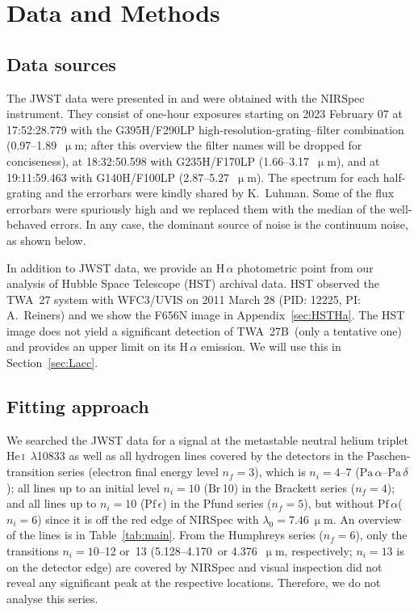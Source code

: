 \documentclass[twocolumn,twocolumnappendix]{aastex631}
\def\mum{\ensuremath{\upmu\mathrm{m}}\xspace}
\newcommand{\neuI}[1]{{\leavevmode{\boldmath\bfseries#1}}}
\newcommand{\neuII}[1]{{\leavevmode{\boldmath\bfseries#1}}}
\renewcommand{\neuI}[1]{{\leavevmode#1}}
\renewcommand{\neuII}[1]{{\leavevmode#1}}
\def\Ha{\ensuremath{\mathrm{H}\,\alpha}\xspace}             %
\def\Paa{\ensuremath{\mathrm{Pa}\,\alpha}\xspace}           %
\def\Pad{\ensuremath{\mathrm{Pa}\,\delta}\xspace}           %
\def\Brz{\ensuremath{\mathrm{Br}}\,10\xspace}               %
\def\Pfa{\ensuremath{\mathrm{Pf}\,\alpha}\xspace}           %
\def\Pfe{\ensuremath{\mathrm{Pf}\,\epsilon}\xspace}         %
\def\HeI{\ensuremath{\mathrm{He}}\,\textsc{i}\xspace}       %
\def\HeItVak{\HeI~\ensuremath{\lambda}10833\xspace}         %
\def\twb{TWA~27B\xspace}
\begin{document}
%

\section{Data and Methods}
 \label{sec:datmeth}


\subsection{Data sources}



The JWST data were presented in \citet{luhman23c} and were obtained with the NIRSpec instrument. They consist of one-hour exposures starting on
2023 February 07 at 17:52:28.779 with the G395H/F290LP
\neuI{high-resolution-}grating--filter combination
(0.97--1.89~\mum; \neuI{after this overview the filter names will be dropped for conciseness}),
%
at 18:32:50.598 with G235H/F170LP (1.66--3.17~\mum), and
%
at 19:11:59.463 with \neuI{G140H/F100LP (2.87--5.27~\mum)}.
%
%
%
%
%
%
%
%
The spectrum for each half-grating and the errorbars were kindly shared by K.~Luhman.
%
%
%
Some of the flux errorbars were spuriously high and we replaced them with the median of the well-behaved errors.
%
%
%
%
%
%
%
%
%
In any case, the dominant source of noise is the continuum noise, as shown below.


\neuI{%
In addition to JWST data, we provide an \Ha photometric point from our analysis of Hubble Space Telescope (HST) archival data.
HST observed the TWA~27 system with WFC3/UVIS on 2011 March 28 (PID: 12225, PI: A.~Reiners) and we show the F656N image in Appendix~\ref{sec:HSTHa}.
The HST image does not yield a significant detection of \twb\ \neuII{(only a tentative one)} and provides an upper limit on its \Ha emission. We will use this in Section~\ref{sec:Lacc}.%
%
}
%



\subsection{Fitting approach}


%
%
%
%
%
%
%
%
%
%


We searched \neuI{the JWST data} for a signal at the metastable neutral helium triplet \HeItVak as well as all hydrogen lines covered by the detectors in the Paschen-transition series (electron final energy level $n_f=3$), which is $n_i=4$--7 (\Paa--\Pad); all lines up to an initial level $n_i=10$ (\Brz) in the Brackett series ($n_f=4$); and all lines up to $n_i=10$ (\Pfe) in the Pfund series ($n_f=5$), \neuI{but without} \Pfa ($n_i=6$) \neuI{since it is off the red edge of NIRSpec} with $\lambda_0=7.46~\upmu$m.
\neuI{An overview of the lines is in Table~\ref{tab:main}.}
%
From the Humphreys series ($n_f=6$), only the transitions $n_i=10$--12 or~13 (5.128--4.170~or 4.376~\mum, respectively; $n_i=13$ is on the detector edge) are covered by NIRSpec and visual inspection did not reveal any significant peak at the respective locations. Therefore, we do not analyse this series.
\end{document}
